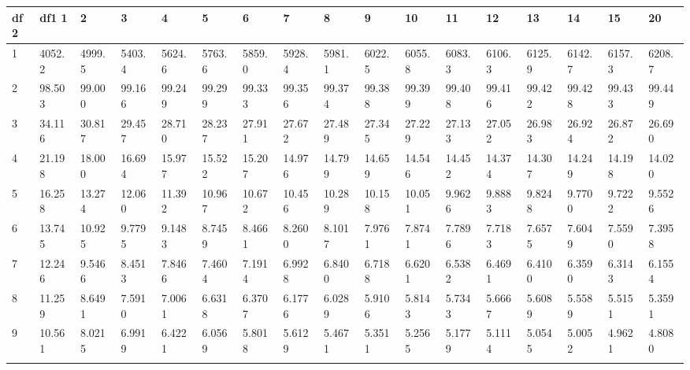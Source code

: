  {
 \fontsize{6pt}{6pt}
 \selectfont

\begin{tabular}{|m{8pt}|m{18pt}*{15}{m{18pt}}}\hline 
df2  & df1      1  &      2  &      3  &      4  &      5  &      6  &      7  &      8  &      9  &     10  &     11  &     12  &     13  &     14  &     15  &     20   \\ \hline 
  1 &  4052.2 &  4999.5 &  5403.4 &  5624.6 &  5763.6 &  5859.0 &  5928.4 &  5981.1 &  6022.5 &  6055.8 &  6083.3 &  6106.3 &  6125.9 &  6142.7 &  6157.3 &  6208.7 \\[2pt] \arrayrulecolor{light-gray}\hline\arrayrulecolor{black}  
  2 & 98.503 & 99.000 & 99.166 & 99.249 & 99.299 & 99.333 & 99.356 & 99.374 & 99.388 & 99.399 & 99.408 & 99.416 & 99.422 & 99.428 & 99.433 & 99.449 \\[2pt] \arrayrulecolor{light-gray}\hline\arrayrulecolor{black}  
  3 & 34.116 & 30.817 & 29.457 & 28.710 & 28.237 & 27.911 & 27.672 & 27.489 & 27.345 & 27.229 & 27.133 & 27.052 & 26.983 & 26.924 & 26.872 & 26.690 \\[2pt] \arrayrulecolor{light-gray}\hline\arrayrulecolor{black}  
  4 & 21.198 & 18.000 & 16.694 & 15.977 & 15.522 & 15.207 & 14.976 & 14.799 & 14.659 & 14.546 & 14.452 & 14.374 & 14.307 & 14.249 & 14.198 & 14.020 \\[2pt] \arrayrulecolor{light-gray}\hline\arrayrulecolor{black}  
  5 & 16.258 & 13.274 & 12.060 & 11.392 & 10.967 & 10.672 & 10.456 & 10.289 & 10.158 & 10.051 & 9.9626 & 9.8883 & 9.8248 & 9.7700 & 9.7222 & 9.5526 \\[2pt] \arrayrulecolor{light-gray}\hline\arrayrulecolor{black}  
  6 & 13.745 & 10.925 & 9.7795 & 9.1483 & 8.7459 & 8.4661 & 8.2600 & 8.1017 & 7.9761 & 7.8741 & 7.7896 & 7.7183 & 7.6575 & 7.6049 & 7.5590 & 7.3958 \\[2pt] \arrayrulecolor{light-gray}\hline\arrayrulecolor{black}  
  7 & 12.246 & 9.5466 & 8.4513 & 7.8466 & 7.4604 & 7.1914 & 6.9928 & 6.8400 & 6.7188 & 6.6201 & 6.5382 & 6.4691 & 6.4100 & 6.3590 & 6.3143 & 6.1554 \\[2pt] \arrayrulecolor{light-gray}\hline\arrayrulecolor{black}  
  8 & 11.259 & 8.6491 & 7.5910 & 7.0061 & 6.6318 & 6.3707 & 6.1776 & 6.0289 & 5.9106 & 5.8143 & 5.7343 & 5.6667 & 5.6089 & 5.5589 & 5.5151 & 5.3591 \\[2pt] \arrayrulecolor{light-gray}\hline\arrayrulecolor{black}  
  9 & 10.561 & 8.0215 & 6.9919 & 6.4221 & 6.0569 & 5.8018 & 5.6129 & 5.4671 & 5.3511 & 5.2565 & 5.1779 & 5.1114 & 5.0545 & 5.0052 & 4.9621 & 4.8080 \\[2pt] \arrayrulecolor{light-gray}\hline\arrayrulecolor{black}  

\end{tabular}}
